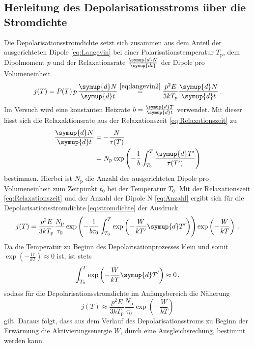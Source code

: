 \subsection{Herleitung des Depolarisationsstroms über die Stromdichte}
\label{sec:stromdichte}
Die Depolarisationsstromdichte setzt sich zusammen aus dem Anteil der ausgerichteten Dipole \eqref{eq:Langevin} bei einer Polarisationstemperatur $T_\text{p}$, dem Dipolmoment $p$ und der Relaxationsrate $\frac{\symup{d}N}{\symup{dt}}$ der Dipole pro Volumeneinheit
\begin{equation}
    j(T)=P(T)\, p \,\frac{\symup{d}N}{\symup{d}t} \stackrel{ \eqref{eq:langevin2} }{=} \frac{p^2 E}{3kT_p}\frac{\symup{d}N}{\symup{d}t} \, .
    \label{eq:stromdichte}
\end{equation}
Im Versuch wird eine konstanten Heizrate $b = \frac{\symup{d}T}{\symup{d}t}$ verwendet.
Mit dieser lässt sich die Relaxaktionsrate aus der Relaxationszeit \eqref{eq:Relaxationszeit} zu
\begin{align}
    \frac{\symup{d}N}{\symup{d}t} & = -\frac{N}{\tau(T)}\notag \\
    & = N_\text{p}\exp\left(-\frac{1}{b}\int_{T_0}^T \frac{\symup{d}T'}{\tau(T')}\right)
    \label{eq:Anzahl}
\end{align}
bestimmen.
Hierbei ist $N_\text{p}$ die Anzahl der ausgerichteten Dipole pro Volumeneinheit zum Zeitpunkt $t_0$ bei der Temperatur $T_0$.
Mit der Relaxationszeit \eqref{eq:Relaxationszeit} und der Anzahl der Dipole N \eqref{eq:Anzahl} ergibt sich für die Depolarisationsstromdichte \eqref{eq:stromdichte} der Ausdruck
\begin{equation}\label{eq:stromdichte2}
    j(T)= \frac{p^2E}{3kT_\text{p}}\frac{N_\text{p}}{\tau_0}\exp\left(-\frac{1}{b\tau_0}\int_{T_0}^T \exp\left(-\frac{W}{kT'}\symup{d}T'\right) \right)\exp\left(-\frac{W}{kT}\right)\, .
\end{equation}
Da die Temperatur zu Beginn des Depolarisationprozesses klein und somit $\exp(-\frac{W}{kT})\approx 0$ ist, ist stets
\begin{equation*}
    \int_{T_0}^T \exp\left(-\frac{W}{kT}\symup{d}T' \right) \approx 0\, ,
\end{equation*}
sodass für die Depolarisationsstromdichte im Anfangsbereich die Näherung
\begin{equation}
    j(T) \approx \frac{p^2 E}{3kT_\text{p}}\frac{N_\text{p}}{\tau_0}\exp\left(-\frac{W}{kT}\right)
    \label{eq:anlauf}
\end{equation}
gilt.
Daraus folgt, dass aus dem Verlauf des Depolarisationsstroms zu Beginn der Erwärmung die Aktivierungsenergie $W$, durch eine Ausgleichsrechung, bestimmt werden kann.
